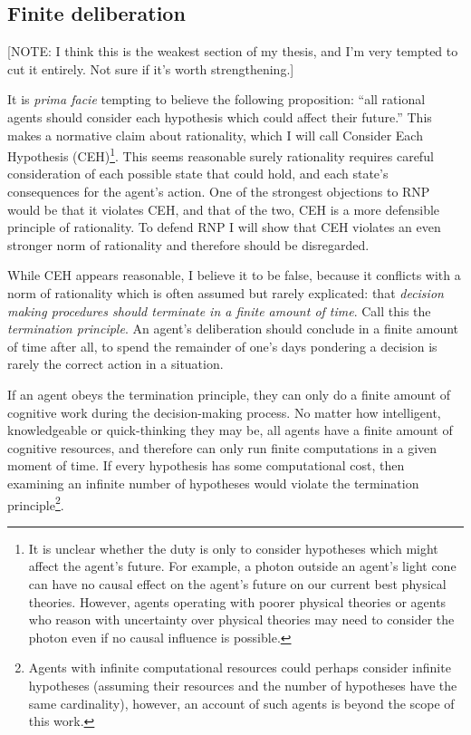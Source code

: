 \documentclass{article}
\begin{document}
\subsection{Finite deliberation}

[NOTE: I think this is the weakest section of my thesis, and I'm very tempted to cut it entirely. Not sure if it's worth strengthening.]

It is \textit{prima facie} tempting to believe the following proposition: ``all rational agents should consider each hypothesis which could affect their future.'' This makes a normative claim about rationality, which I will call Consider Each Hypothesis (CEH)\footnote{It is unclear whether the duty is only to consider hypotheses which might affect the agent's future. For example, a photon outside an agent's light cone can have no causal effect on the agent's future on our current best physical theories. However, agents operating with poorer physical theories \textemdash{} or agents who reason with uncertainty over physical theories \textemdash{} may need to consider the photon even if no causal influence is possible.}. This seems reasonable \textemdash{} surely rationality requires careful consideration of each possible state that could hold, and each state's consequences for the agent's action. One of the strongest objections to RNP would be that it violates CEH, and that of the two, CEH is a more defensible principle of rationality. To defend RNP I will show that CEH violates an even stronger norm of rationality and therefore should be disregarded.

While CEH appears reasonable, I believe it to be false, because it conflicts with a norm of rationality which is often assumed but rarely explicated: that \textit{decision making procedures should terminate in a finite amount of time}. Call this the \textit{termination principle}. An agent's deliberation should conclude in a finite amount of time \textemdash{} after all, to spend the remainder of one's days pondering a decision is rarely the correct action in a situation. 

If an agent obeys the termination principle, they can only do a finite amount of cognitive work during the decision-making process. No matter how intelligent, knowledgeable or quick-thinking they may be, all agents have a finite amount of cognitive resources, and therefore can only run finite computations in a given moment of time. If every hypothesis has some computational cost, then examining an infinite number of hypotheses would violate the termination principle\footnote{Agents with infinite computational resources could perhaps consider infinite hypotheses (assuming their resources and the number of hypotheses have the same cardinality), however, an account of such agents is beyond the scope of this work.}. 
\end{document}
